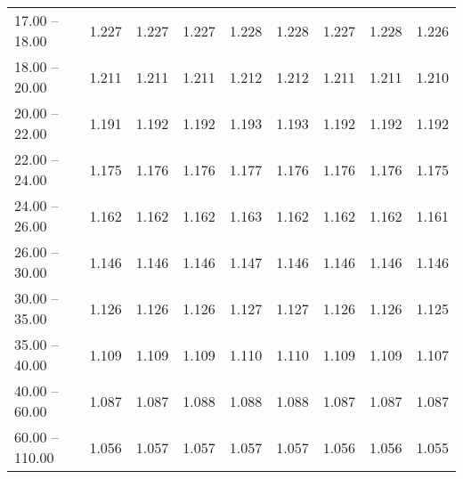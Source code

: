 \begin{table}[htp]
\begin{tiny}
\begin{center}
\begin{tabular}{|l|c|c|c|c|c|c|c|c|}
      17.00 -- 18.00 &  1.227 & 1.227 & 1.227 & 1.228 & 1.228 & 1.227 & 1.228 & 1.226 \\ 
      18.00 -- 20.00 &  1.211 & 1.211 & 1.211 & 1.212 & 1.212 & 1.211 & 1.211 & 1.210 \\ 
      20.00 -- 22.00 &  1.191 & 1.192 & 1.192 & 1.193 & 1.193 & 1.192 & 1.192 & 1.192 \\ 
      22.00 -- 24.00 &  1.175 & 1.176 & 1.176 & 1.177 & 1.176 & 1.176 & 1.176 & 1.175 \\ 
      24.00 -- 26.00 &  1.162 & 1.162 & 1.162 & 1.163 & 1.162 & 1.162 & 1.162 & 1.161 \\ 
      26.00 -- 30.00 &  1.146 & 1.146 & 1.146 & 1.147 & 1.146 & 1.146 & 1.146 & 1.146 \\ 
      30.00 -- 35.00 &  1.126 & 1.126 & 1.126 & 1.127 & 1.127 & 1.126 & 1.126 & 1.125 \\ 
      35.00 -- 40.00 &  1.109 & 1.109 & 1.109 & 1.110 & 1.110 & 1.109 & 1.109 & 1.107 \\ 
      40.00 -- 60.00 &  1.087 & 1.087 & 1.088 & 1.088 & 1.088 & 1.087 & 1.087 & 1.087 \\ 
      60.00 -- 110.00 &  1.056 & 1.057 & 1.057 & 1.057 & 1.057 & 1.056 & 1.056 & 1.055 \\ 
\hline
\end{tabular} 
             \end{center} 
             \end{tiny} 
             \label{tab:sa_trpp_jpsi8} 
             \end{table}


